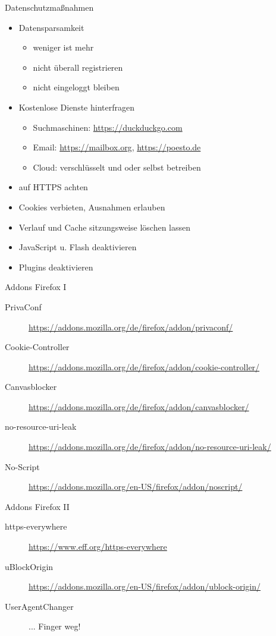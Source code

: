 \documentclass[hyperref={colorlinks,linkcolor=white}, utf8]{beamer}
\begin{document}
	\begin{frame}{Datenschutzmaßnahmen}
		\begin{itemize}
			\item Datensparsamkeit
			\begin{itemize}
				\item weniger ist mehr
				\item nicht überall registrieren
				\item nicht eingeloggt bleiben
			\end{itemize}
			\item Kostenlose Dienste hinterfragen
			\begin{itemize}
				\item Suchmaschinen: \url{https://duckduckgo.com}
				\item Email: \url{https://mailbox.org}, \url{https://poesto.de}
				\item Cloud: verschlüsselt und oder selbst betreiben
			\end{itemize}
			\item auf HTTPS achten
			\item Cookies verbieten, Ausnahmen erlauben
			\item Verlauf und Cache sitzungsweise löschen lassen
			\item JavaScript u. Flash deaktivieren
			\item Plugins deaktivieren
		\end{itemize}
	\end{frame}
	
	\begin{frame}{Addons Firefox I}
		\noindent
		\begin{description}
			\item[PrivaConf] \url{https://addons.mozilla.org/de/firefox/addon/privaconf/}
			\item[Cookie-Controller] \url{https://addons.mozilla.org/de/firefox/addon/cookie-controller/}
			\item[Canvasblocker] \url{https://addons.mozilla.org/de/firefox/addon/canvasblocker/}
			\item[no-resource-uri-leak] \url{https://addons.mozilla.org/de/firefox/addon/no-resource-uri-leak/}
			\item[No-Script] \url{https://addons.mozilla.org/en-US/firefox/addon/noscript/}
		\end{description}
	\end{frame}

	\begin{frame}{Addons Firefox II}
		\noindent
		\begin{description}
			\item[https-everywhere]\url{https://www.eff.org/https-everywhere}
			\item[uBlockOrigin]\url{https://addons.mozilla.org/en-US/firefox/addon/ublock-origin/}
			\item[UserAgentChanger]{... Finger weg!}
		\end{description}
	\end{frame}
	
\end{document}

